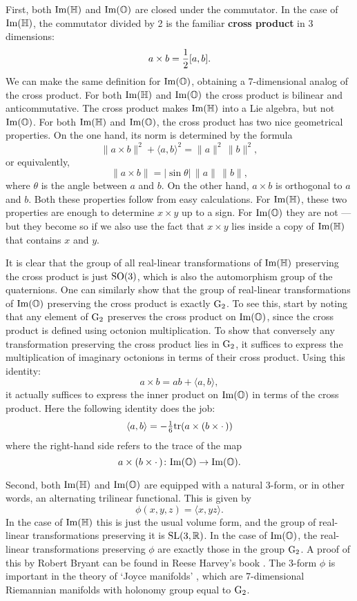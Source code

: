 \documentclass[12pt]{article}
\newcommand\R{{\mathbb R}}
\renewcommand\H{{\mathbb H}}
\renewcommand\O{{\mathbb O}}
\newcommand{\SO}{{\rm SO}}
\newcommand{\SL}{{\rm SL}}
\newcommand{\G}{{\rm G}}
\renewcommand{\Im}{{\rm Im}}
\newcommand{\be}{\begin{equation}}
\newcommand{\ee}{\end{equation}}
\newcommand{\maps}{\colon}
\newcommand{\tr}{{\rm tr}}
\begin{document}
First, both $\Im(\H)$ and $\Im(\O)$ are closed under the commutator. In    
the case of $\Im(\H)$, the commutator divided by 2 is the familiar {\bf   
cross product} in 3 dimensions:   
\[            a \times b = {1\over 2}[a,b]  .\]   
We can make the same definition for $\Im(\O)$, obtaining a 7-dimensional   
analog of the cross product.   For both $\Im(\H)$ and $\Im(\O)$ the   
cross product is bilinear and anticommutative.   The cross product   
makes $\Im(\H)$ into a Lie algebra, but not $\Im(\O)$.  For both   
$\Im(\H)$ and $\Im(\O)$, the cross product has two nice    
geometrical properties.  On the one hand, its norm is determined by the    
formula   
\[    \|a \times b\|^2 + \langle a,b\rangle^2 = \|a\|^2 \, \|b\|^2 , \]   
or equivalently,    
\[   \|a \times b\| = | {\sin \theta}| \, \|a\| \, \|b\| ,  \]   
where $\theta$ is the angle between $a$ and $b$.  On the other hand, $a   
\times b$ is orthogonal to $a$ and $b$.  Both these properties follow   
from easy calculations.  For $\Im(\H)$, these two properties are enough   
to determine $x \times y$ up to a sign.  For $\Im(\O)$ they are not ---   
but they become so if we also use the fact that $x \times y$ lies inside   
a copy of $\Im(\H)$ that contains $x$ and $y$.    
   
It is clear that the group of all real-linear transformations of   
$\Im(\H)$ preserving the cross product is just $\SO(3)$, which is also   
the automorphism group of the quaternions.  One can similarly show that   
the group of real-linear transformations of $\Im(\O)$ preserving the   
cross product is exactly $\G_2$.  To see this, start by noting that any   
element of $\G_2$ preserves the cross product on $\Im(\O)$, since the   
cross product is defined using octonion multiplication.  To show that   
conversely any transformation preserving the cross product lies in   
$\G_2$, it suffices to express the multiplication of imaginary octonions    
in terms of their cross product.  Using this identity:   
\[  a \times b = ab + \langle a, b\rangle   , \]   
it actually suffices to express the inner product on $\Im(\O)$ in terms   
of the cross product.  Here the following identity does the job:    
\be  \langle a,b\rangle =   
-\textstyle{1\over 6}\tr(a \times (b \times \cdot\,))    
\label{inner} \ee   
where the right-hand side refers to the trace of the map   
\[       a \times (b \times \cdot\,) \maps \Im(\O) \to \Im(\O)  .\]   
   
Second, both $\Im(\H)$ and $\Im(\O)$ are equipped with a natural 3-form,   
or in other words, an alternating trilinear functional.  This is given   
by   
\[        \phi(x,y,z) = \langle x,yz \rangle  .\]   
In the case of $\Im(\H)$ this is just the usual volume form, and the   
group of real-linear transformations preserving it is $\SL(3, \R)$.   In   
the case of $\Im(\O)$, the real-linear transformations preserving $\phi$   
are exactly those in the group $\G_2$.  A proof of this by Robert  
Bryant can be found in Reese Harvey's book \cite{Harvey}.   The 3-form   
$\phi$ is important in the theory of `Joyce manifolds' \cite{Joyce},  
which are 7-dimensional Riemannian manifolds with holonomy group equal  
to $\G_2$.  
   
\end{document}
